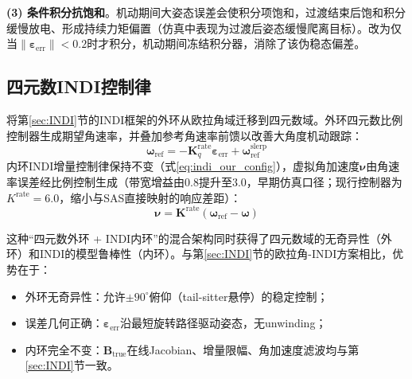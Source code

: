 \textbf{(3) 条件积分抗饱和}。机动期间大姿态误差会使积分项饱和，过渡结束后饱和积分缓慢放电、形成持续力矩偏置（仿真中表现为过渡后姿态缓慢爬离目标）。改为仅当$\|\boldsymbol{\varepsilon}_{\text{err}}\|<0.2$时才积分，机动期间冻结积分器，消除了该伪稳态偏差。

\subsection{四元数INDI控制律}

将第\ref{sec:INDI}节的INDI框架的外环从欧拉角域迁移到四元数域。外环四元数比例控制器生成期望角速率，并叠加参考角速率前馈以改善大角度机动跟踪：
\begin{equation}
    \boldsymbol{\omega}_{\text{ref}} = -\mathbf{K}_q^{\text{rate}} \boldsymbol{\varepsilon}_{\text{err}} + \boldsymbol{\omega}_{\text{ref}}^{\text{slerp}}
    \label{eq:indi_outer_quat}
\end{equation}
内环INDI增量控制律保持不变（式\ref{eq:indi_our_config}），虚拟角加速度$\boldsymbol{\nu}$由角速率误差经比例控制生成（带宽增益由$0.8$提升至$3.0$，早期仿真口径；现行控制器为$K^{\text{rate}}=6.0$，缩小与SAS直接映射的响应差距）：
\begin{equation}
    \boldsymbol{\nu} = \mathbf{K}^{\text{rate}}(\boldsymbol{\omega}_{\text{ref}} - \boldsymbol{\omega})
    \label{eq:indi_inner_quat}
\end{equation}

这种``四元数外环 + INDI内环''的混合架构同时获得了四元数域的无奇异性（外环）和INDI的模型鲁棒性（内环）。与第\ref{sec:INDI}节的欧拉角-INDI方案相比，优势在于：
\begin{itemize}
    \item 外环无奇异性：允许$\pm90^\circ$俯仰（tail-sitter悬停）的稳定控制；
    \item 误差几何正确：$\boldsymbol{\varepsilon}_{\text{err}}$沿最短旋转路径驱动姿态，无unwinding；
    \item 内环完全不变：$\mathbf{B}_{\text{true}}$在线Jacobian、增量限幅、角加速度滤波均与第\ref{sec:INDI}节一致。
\end{itemize}
